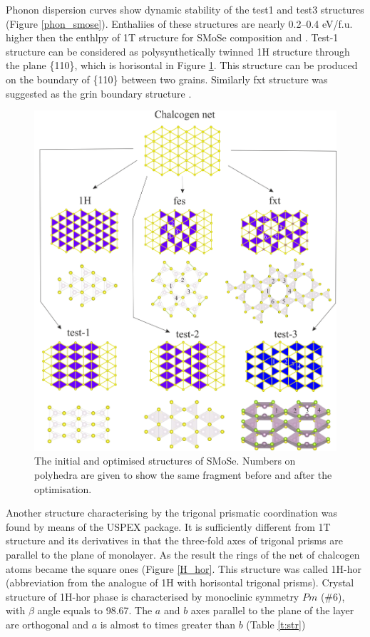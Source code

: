 \documentclass[a4paperm]{article}
\begin{document}
Phonon dispersion curves show dynamic stability of the test1 and test3 structures (Figure \ref{phon_smose}).
Enthaliies of these structures are nearly 0.2--0.4 eV/f.u. higher then the enthlpy of 1T structure for SMoSe composition and .
Test-1 structure can be considered as polysynthetically twinned 1H structure through the plane \{110\}, which is horisontal in Figure \ref{H-based}.
This structure can be produced on the boundary of \{110\} between two grains.
Similarly fxt structure was suggested as the grin boundary structure \cite{}.

\begin{figure}[H] \centering
        \includegraphics[width=\textwidth]{H-based.png}
        \caption{The initial and optimised structures of SMoSe. Numbers on polyhedra are given to show the same fragment before and after the optimisation.}
\label{H-based}
\end{figure}


Another structure characterising by the trigonal prismatic coordination was found by means of the USPEX package.
It is sufficiently different from 1T structure and its derivatives in that the three-fold axes of trigonal prisms are parallel to the plane of monolayer.
As the result the rings of the net of chalcogen atoms became the square ones (Figure \ref{H_hor}.
This structure was called 1H-hor (abbreviation from the analogue of 1H with horisontal trigonal prisms).
Crystal structure of 1H-hor phase is characterised by monoclinic symmetry $Pm$ (\#6), with $\beta$ angle equals to 98.67\textdegree.
The $a$ and $b$ axes parallel to the plane of the layer are orthogonal and $a$ is almost to times greater than $b$ (Table \ref{t:str})
\end{document}
